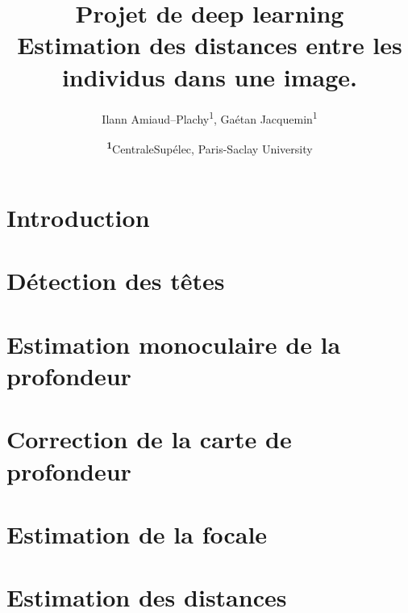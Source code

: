 \documentclass[
	a4paper, %
	10pt, %
	unnumberedsections, %
	twoside, %
]{LTJournalArticle}
\title{Projet de deep learning\\ \LARGE Estimation des distances entre les individus dans une image.} %
\author{%
    Ilann Amiaud--Plachy\textsuperscript{1},
    Gaétan Jacquemin\textsuperscript{1}
}
\date{\footnotesize\textsuperscript{\textbf{1}}CentraleSupélec, Paris-Saclay University}
\begin{document}
    \maketitle %


    \section{Introduction}

        

    \section{Détection des têtes}

        

    \section{Estimation monoculaire de la profondeur}

        

    \section{Correction de la carte de profondeur}

        

    \section{Estimation de la focale}

        

    \section{Estimation des distances}

        

    \printbibliography
\end{document}
